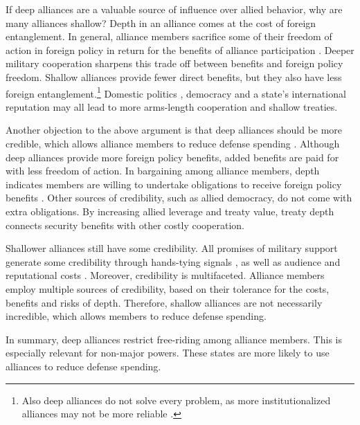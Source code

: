 \documentclass[12pt]{article}
\begin{document}
If deep alliances are a valuable source of influence over allied behavior, why are many alliances shallow? 
Depth in an alliance comes at the cost of foreign entanglement. 
In general, alliance members sacrifice some of their freedom of action in foreign policy in return for the benefits of alliance participation \citep{Altfield1984, Snyder1997}.
Deeper military cooperation sharpens this trade off between benefits and foreign policy freedom. 
Shallow alliances provide fewer direct benefits, but they also have less foreign entanglement.\footnote{Also deep alliances do not solve every problem, as more institutionalized alliances may not be more reliable \citep{LeedsAnac2005}.}
Domestic politics \citep{Davis2004}, democracy \citep{Chibaetal2015} and a state's international reputation \citep{Mattes2012} may all lead to more arms-length cooperation and shallow treaties. 


Another objection to the above argument is that deep alliances should be more credible, which allows alliance members to reduce defense spending \citep{DigiuseppePoast2016}. 
Although deep alliances provide more foreign policy benefits, added benefits are paid for with less freedom of action. 
In bargaining among alliance members, depth indicates members are willing to undertake obligations to receive foreign policy benefits \citep{Weber1997}.  
Other sources of credibility, such as allied democracy, do not come with extra obligations. 
By increasing allied leverage and treaty value, treaty depth connects security benefits with other costly cooperation. 


Shallower alliances still have some credibility.
All promises of military support generate some credibility through hands-tying signals \citep{Fearon1997}, as well as audience \cite{Morrow2000} and reputational costs \citep{Gibler2008, Crescenzietal2012}.  
Moreover, credibility is multifaceted. 
Alliance members employ multiple sources of credibility, based on their tolerance for the costs, benefits and risks of depth. 
Therefore, shallow alliances are not necessarily incredible, which allows members to reduce defense spending.  


In summary, deep alliances restrict free-riding among alliance members. 
This is especially relevant for non-major powers.
These states are more likely to use alliances to reduce defense spending. 
\end{document}
